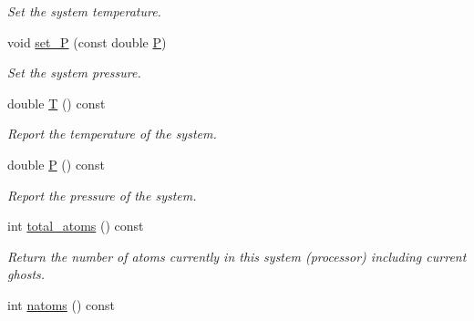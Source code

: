 \begin{DoxyCompactItemize}
\begin{DoxyCompactList}\small\item\em Set the system temperature. \end{DoxyCompactList}\item 
\hypertarget{classsim__system_1_1System_a53a8a951a84669ca9cfb7521e3505389}{void \hyperlink{classsim__system_1_1System_a53a8a951a84669ca9cfb7521e3505389}{set\-\_\-\-P} (const double \hyperlink{classsim__system_1_1System_a523169f75aeba188b8b73a1a339e9e0a}{P})}\label{classsim__system_1_1System_a53a8a951a84669ca9cfb7521e3505389}

\begin{DoxyCompactList}\small\item\em Set the system pressure. \end{DoxyCompactList}\item 
\hypertarget{classsim__system_1_1System_a391570cba138604ffb8e242ea8207255}{double \hyperlink{classsim__system_1_1System_a391570cba138604ffb8e242ea8207255}{T} () const }\label{classsim__system_1_1System_a391570cba138604ffb8e242ea8207255}

\begin{DoxyCompactList}\small\item\em Report the temperature of the system. \end{DoxyCompactList}\item 
\hypertarget{classsim__system_1_1System_a523169f75aeba188b8b73a1a339e9e0a}{double \hyperlink{classsim__system_1_1System_a523169f75aeba188b8b73a1a339e9e0a}{P} () const }\label{classsim__system_1_1System_a523169f75aeba188b8b73a1a339e9e0a}

\begin{DoxyCompactList}\small\item\em Report the pressure of the system. \end{DoxyCompactList}\item 
\hypertarget{classsim__system_1_1System_a4f4cd4e3e72ba25b8bbde4ca095f1ae9}{int \hyperlink{classsim__system_1_1System_a4f4cd4e3e72ba25b8bbde4ca095f1ae9}{total\-\_\-atoms} () const }\label{classsim__system_1_1System_a4f4cd4e3e72ba25b8bbde4ca095f1ae9}

\begin{DoxyCompactList}\small\item\em Return the number of atoms currently in this system (processor) including current ghosts. \end{DoxyCompactList}\item 
\hypertarget{classsim__system_1_1System_a644ace6a33a7190c7765a94f04f75e0e}{int \hyperlink{classsim__system_1_1System_a644ace6a33a7190c7765a94f04f75e0e}{natoms} () const }\label{classsim__system_1_1System_a644ace6a33a7190c7765a94f04f75e0e}


\end{DoxyCompactItemize}
